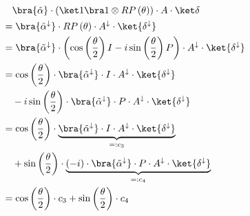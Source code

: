 \begin{equation}
    \label{eq:single-prob-simplification2}
    \begin{split}
            &\quad \bra{\tilde\alpha} \cdot (\ket 1 \bra 1 \otimes RP\left(\theta\right)) \cdot A \cdot \ket\delta \\
            &= \bra{\tilde\alpha^\downarrow} \cdot RP\left(\theta\right) \cdot A^\downarrow \cdot \ket{\delta^\downarrow} \\
            &= \bra{\tilde\alpha^\downarrow} \cdot \left(\cos\left(\frac\theta2\right) I - i \sin\left(\frac\theta2\right) P\right) \cdot A^\downarrow \cdot \ket{\delta^\downarrow} \\
            &= \cos\left(\frac\theta2\right) \cdot \bra{\tilde\alpha^\downarrow} \cdot I \cdot A^\downarrow \cdot \ket{\delta^\downarrow} \\
                &\quad - i \sin\left(\frac\theta2\right) \cdot \bra{\tilde\alpha^\downarrow} \cdot P \cdot A^\downarrow \cdot \ket{\delta^\downarrow} \\
            &= \cos\left(\frac\theta2\right) \cdot \underbrace{\bra{\tilde\alpha^\downarrow} \cdot I \cdot A^\downarrow \cdot \ket{\delta^\downarrow}}_{=: c_3} \\
                &\quad + \sin\left(\frac\theta2\right) \cdot \underbrace{\left(-i\right)\cdot \bra{\tilde\alpha^\downarrow} \cdot P \cdot A^\downarrow \cdot \ket{\delta^\downarrow}}_{=: c_4} \\
            &= \cos\left(\frac\theta2\right) \cdot c_3 + \sin\left(\frac\theta2\right) \cdot c_4
    \end{split}
\end{equation}

